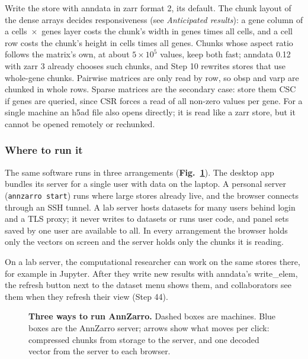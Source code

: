 Write the store with anndata in zarr format 2, its default. The chunk layout of the dense arrays decides responsiveness (see \textit{Anticipated results}): a gene column of a cells~$\times$~genes layer costs the chunk's width in genes times all cells, and a cell row costs the chunk's height in cells times all genes. Chunks whose aspect ratio follows the matrix's own, at about $5\times10^5$ values, keep both fast; anndata 0.12 with zarr 3 already chooses such chunks, and Step 10 rewrites stores that use whole-gene chunks. Pairwise matrices are only read by row, so obsp and varp are chunked in whole rows. Sparse matrices are the secondary case: store them CSC if genes are queried, since CSR forces a read of all non-zero values per gene. For a single machine an h5ad file also opens directly; it is read like a zarr store, but it cannot be opened remotely or rechunked.

\subsubsection{Where to run it}

The same software runs in three arrangements (\textbf{Fig.~\ref{fig:deploy}}). The desktop app bundles its server for a single user with data on the laptop. A personal server (\texttt{annzarro start}) runs where large stores already live, and the browser connects through an SSH tunnel. A lab server hosts datasets for many users behind login and a TLS proxy; it never writes to datasets or runs user code, and panel sets saved by one user are available to all. In every arrangement the browser holds only the vectors on screen and the server holds only the chunks it is reading.

On a lab server, the computational researcher can work on the same stores there, for example in Jupyter. After they write new results with anndata's write\_elem, the refresh button next to the dataset menu shows them, and collaborators see them when they refresh their view (Step 44).

\begin{figure}[t]
\centering

\caption{\textbf{Three ways to run AnnZarro.} Dashed boxes are machines. Blue boxes are the AnnZarro server; arrows show what moves per click: compressed chunks from storage to the server, and one decoded vector from the server to each browser.}
\label{fig:deploy}
\end{figure}

